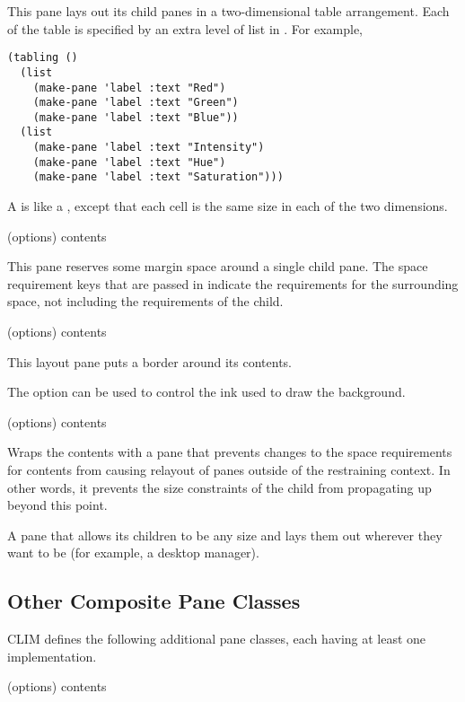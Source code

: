 This pane lays out its child panes in a two-dimensional table arrangement.  Each
of the table is specified by an extra level of list in .  For example,

\begin{verbatim}
(tabling ()
  (list
    (make-pane 'label :text "Red")
    (make-pane 'label :text "Green")
    (make-pane 'label :text "Blue"))
  (list
    (make-pane 'label :text "Intensity")
    (make-pane 'label :text "Hue")
    (make-pane 'label :text "Saturation")))
\end{verbatim}



A  is like a , except that each cell is the same
size in each of the two dimensions.


 {(\rest options) \body contents}

This pane reserves some margin space around a single child pane.  The space
requirement keys that are passed in indicate the requirements for the
surrounding space, not including the requirements of the child.


 {(\rest options) \body contents}

This layout pane puts a border around its contents.

The  option can be used to control the ink used to draw the
background.


 {(\rest options) \body contents}

Wraps the contents with a pane that prevents changes to the space requirements
for contents from causing relayout of panes outside of the restraining context.
In other words, it prevents the size constraints of the child from propagating
up beyond this point.



A pane that allows its children to be any size and lays them out wherever they
want to be (for example, a desktop manager).


\subsection {Other Composite Pane Classes}

CLIM defines the following additional pane classes, each having at least one
implementation.

 {(\rest options) \body contents}

